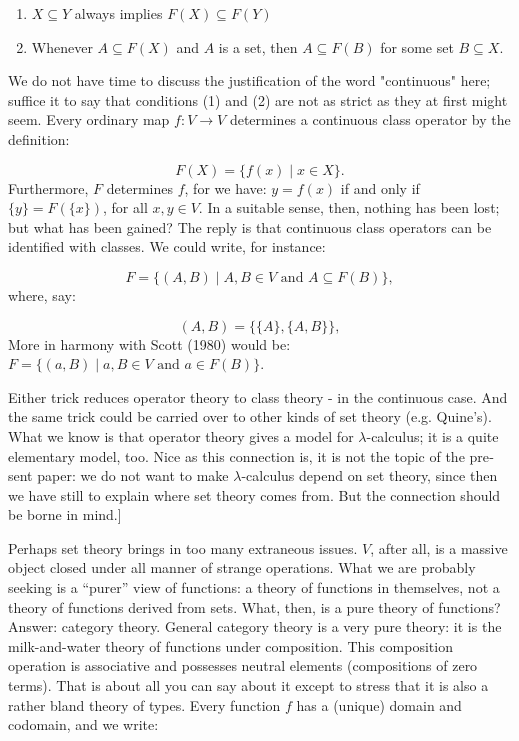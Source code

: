 \documentclass[12pt]{article}
\def\to{\rightarrow}
\def\inc{\subseteq}
\def\l{\lambda}
\def\V{V}
\begin{document}
\begin{enumerate}

\item $X \inc Y$ always implies $F(X)\inc F(Y)$

\item Whenever $A \inc F(X)$ and $A$ is a set, then $A\inc F(B)$ for some set $B \inc X$.

\end{enumerate}
%
We do not have time to discuss the justification of the word "continuous" here; suffice it to say that conditions (1) and (2) are not as strict as they at first might seem. Every ordinary map $f : \V \to \V$ determines a continuous class operator by the def­inition:

$$
F(X) = \{f(x) \mid x \in X\}.
$$
%
Furthermore, $F$ determines $f$, for we have: $y = f(x)$ if and only if $\{y\} = F(\{x\})$,
for all $x,y \in \V$. In a suitable sense, then, nothing has been lost; but what has been gained?
The reply is that continuous class operators can be identi­fied with classes. We could write, for instance:

$$ F = \{(A,B) \mid A,B \in \V {\textrm { and }} A \inc F(B) \},$$
where, say:

$$
(A,B) = \{\{A\}, \{A,B\}\},
$$
More in harmony with Scott (1980) would be: $F = \{(a,B) \mid  a,B \in \V {\textrm { and } } a \in F(B)\}$.

Either trick reduces operator theory to class theory - in the continuous case. And the same trick could be carried over to other kinds of set theory (e.g. Quine's). What we know is that operator theory gives a model for $\l$-calculus; it is a quite elementary model, too. Nice as this connection is, it is not the topic of the pre­ sent paper: we do not want to make $\l$-calculus depend on set theory, since then we have still to explain where set theory comes from. But the connection should be borne in mind.]

Perhaps set theory brings in too many extraneous issues. $\V$, after all, is a massive object closed under all manner of strange operations. What we are probably seeking is a ``purer'' view of functions: a theory of functions in themselves, not a theory of functions derived from sets. What, then, is a pure theory of functions? Answer: category theory. General category theory is a very pure theory: it is the milk-and-water theory of functions under composition. This composition operation is associative and possesses neutral ele­ments (compositions of zero terms). That is about all you can say about it except to stress that it is also a rather bland theory of types. Every function $f$ has a (unique) domain and codomain, and we write:
\end{document}
